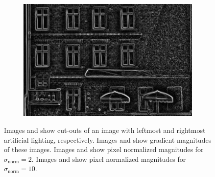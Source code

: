 \documentclass[thesis.tex]{subfiles}
\begin{document}
\begin{figure}[H]
\begin{subfigure}[t]{0.49\textwidth}
        \includegraphics[width=\textwidth]{img/pixelNormalizationExample8.png}
        \caption{}
        \label{fig:pixelNormalizationExample8}
    \end{subfigure}
    \caption{Images  and  show cut-outs of an image with leftmost and rightmost artificial lighting, respectively. Images  and  show gradient magnitudes of these images. Images  and  show pixel normalized magnitudes for $\sigma_\text{norm} = 2$. Images  and  show pixel normalized magnitudes for $\sigma_\text{norm} = 10$.}
    \label{fig:pixelNormalizationExample}
\end{figure}
%
\end{document}
